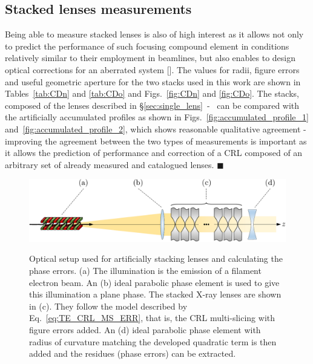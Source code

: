 \begin{refsection}
\subsection{Stacked lenses measurements}\label{sec:lens_stack}

Being able to measure stacked lenses is also of high interest as it allows not only to predict the performance of such focusing compound element in conditions relatively similar to their employment in beamlines, but also enables to design optical corrections for an aberrated system [\cite{Seiboth2017, Seiboth2020}]. The values for radii, figure errors and useful geometric aperture for the two stacks used in this work are shown in Tables~\ref{tab:CDn} and \ref{tab:CDo} and Figs.~\ref{fig:CDn} and \ref{fig:CDo}. The stacks, composed of the lenses described in \S\ref{sec:single_lens}~-~\textit{} can be compared with the artificially accumulated profiles as shown in Figs.~\ref{fig:accumulated_profile_1} and~\ref{fig:accumulated_profile_2}, which shows reasonable qualitative agreement - improving the agreement between the two types of measurements is important as it allows the prediction of performance and correction of a CRL composed of an arbitrary set of already measured and catalogued lenses. $\blacksquare$

\begin{figure}[t]
    \centering
    {\includegraphics[width=.7\linewidth]{figures/ch04b/recovered_phase.pdf}}
    \caption[Optical layout used for artificially stacking lenses]{Optical setup used for artificially stacking lenses and calculating the phase errors. (a) The illumination is the emission of a filament electron beam. An (b) ideal parabolic phase element is used to give this illumination a plane phase. The stacked X-ray lenses are shown in (c). They follow the model described by Eq.~\ref{eq:TE_CRL_MS_ERR}, that is, the CRL multi-slicing with figure errors added. An (d) ideal parabolic phase element with radius of curvature matching the developed quadratic term is then added and the residues (phase errors) can be extracted.}
    \label{fig:accumulated_extraction}
\end{figure}


\end{refsection}
